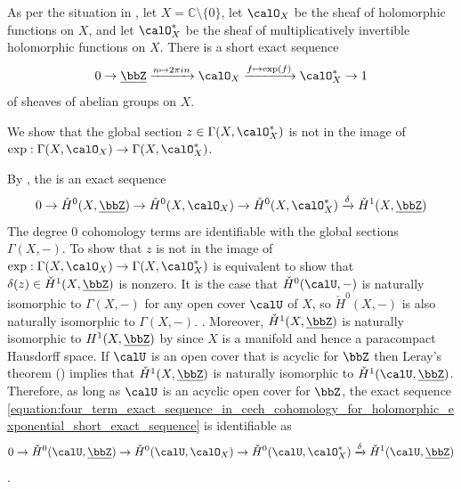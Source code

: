 \begin{example}
    As per the situation in , let $X = \mathbb{C} \setminus \{0\}$, let $\calO_X$ be the sheaf of holomorphic functions on $X$, and let $\calO_X^*$ be the sheaf of multiplicatively invertible holomorphic functions on $X$. There is a short exact sequence
    $$0 \to \underline{\bbZ} \xrightarrow{n \mapsto 2 \pi i n} \calO_X \xrightarrow{f \mapsto \exp(f) } \calO_X^* \to 1$$
    of sheaves of abelian groups on $X$. 

    We show that the global section $z \in \Gamma(X, \calO_X^*)$ is not in the image of $\exp: \Gamma(X, \calO_X) \to \Gamma(X, \calO_X^*)$. 

    By , the is an exact sequence
    \begin{equation}  \label{equation:four_term_exact_sequence_in_cech_cohomology_for_holomorphic_exponential_short_exact_sequence}
        0 \to \check{H}^0(X,\underline{\bbZ}) \to \check{H}^0(X, \calO_X)  \to \check{H}^0(X, \calO_X^*) \xrightarrow{\delta} \check{H}^1(X,\underline{\bbZ}) 
    \end{equation}
    The degree $0$ cohomology terms are identifiable with the global sections $\Gamma(X, -)$. To show that $z$ is not in the image of $\exp: \Gamma(X, \calO_X) \to \Gamma(X, \calO_X^*)$ is equivalent to show that $\delta(z) \in \check{H}^1(X,\underline{\bbZ})$ is nonzero. It is the case that $\check{H}^0(\calU,-)$ is naturally isomorphic to $\Gamma(X,-)$ for any open cover $\calU$ of $X$, so $\check{H}^0(X,-)$ is also naturally isomorphic to $\Gamma(X,-)$. . Moreover, $\check{H}^1(X, \underline{\bbZ})$ is naturally isomorphic to $H^1(X, \underline{\bbZ})$ by  since $X$ is a manifold and hence  a paracompact Hausdorff space. If $\calU$ is an open cover that is acyclic for $\bbZ$ then Leray's theorem () implies that $\check{H}^1(X, \underline{\bbZ})$ is naturally isomorphic to $\check{H}^1(\calU, \underline{\bbZ})$. Therefore, as long as $\calU$ is an acyclic open cover for $\bbZ$, the exact sequence \eqref{equation:four_term_exact_sequence_in_cech_cohomology_for_holomorphic_exponential_short_exact_sequence} is identifiable as
    \begin{equation} \label{equation:four_term_exact_sequence_in_cech_cohomology_for_holomorphic_exponential_short_exact_sequence_with_respect_to_nice_cover}
        0 \to \check{H}^0(\calU,\underline{\bbZ}) \to \check{H}^0(\calU, \calO_X)  \to \check{H}^0(\calU, \calO_X^*) \xrightarrow{\delta} \check{H}^1(\calU,\underline{\bbZ}) 
    \end{equation}
.


\end{example}
